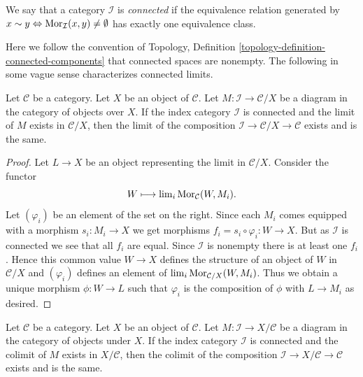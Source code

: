 \begin{definition}
\label{definition-category-connected}
We say that a category $\mathcal{I}$ is {\it connected}
if the equivalence relation generated by
$x \sim y \Leftrightarrow \mathop{\mathrm{Mor}}\nolimits_\mathcal{I}(x, y) \not = \emptyset$
has exactly one equivalence class.
\end{definition}

\noindent
Here we follow the convention of
Topology, Definition \ref{topology-definition-connected-components}
that connected spaces are nonempty.
The following in some vague sense characterizes connected limits.

\begin{lemma}
\label{lemma-connected-limit-over-X}
Let $\mathcal{C}$ be a category.
Let $X$ be an object of $\mathcal{C}$.
Let $M : \mathcal{I} \to \mathcal{C}/X$ be a diagram
in the category of objects over $X$.
If the index category $\mathcal{I}$ is connected
and the limit of $M$ exists in $\mathcal{C}/X$,
then the limit of the composition
$\mathcal{I} \to \mathcal{C}/X \to \mathcal{C}$
exists and is the same.
\end{lemma}

\begin{proof}
Let $L \to X$ be an object representing the limit in $\mathcal{C}/X$.
Consider the functor
$$
W \longmapsto \mathop{\mathrm{lim}}\nolimits_i \mathop{\mathrm{Mor}}\nolimits_\mathcal{C}(W, M_i).
$$
Let $(\varphi_i)$ be an element of the set on the right.
Since each $M_i$ comes equipped with a morphism $s_i : M_i \to X$ we
get morphisms $f_i = s_i \circ \varphi_i : W \to X$. But as $\mathcal{I}$
is connected we see that all $f_i$ are equal. Since $\mathcal{I}$
is nonempty there is at least one $f_i$.
Hence this common value $W \to X$ defines the structure of an
object of $W$ in $\mathcal{C}/X$ and $(\varphi_i)$ defines an
element of $\mathop{\mathrm{lim}}\nolimits_i \mathop{\mathrm{Mor}}\nolimits_{\mathcal{C}/X}(W, M_i)$.
Thus we obtain a unique morphism $\phi : W \to L$ such that
$\varphi_i$ is the composition of $\phi$ with $L \to M_i$ as desired.
\end{proof}

\begin{lemma}
\label{lemma-connected-colimit-under-X}
Let $\mathcal{C}$ be a category.
Let $X$ be an object of $\mathcal{C}$.
Let $M : \mathcal{I} \to X/\mathcal{C}$ be a diagram
in the category of objects under $X$.
If the index category $\mathcal{I}$ is connected
and the colimit of $M$ exists in $X/\mathcal{C}$,
then the colimit of the composition
$\mathcal{I} \to X/\mathcal{C} \to \mathcal{C}$
exists and is the same.
\end{lemma}

